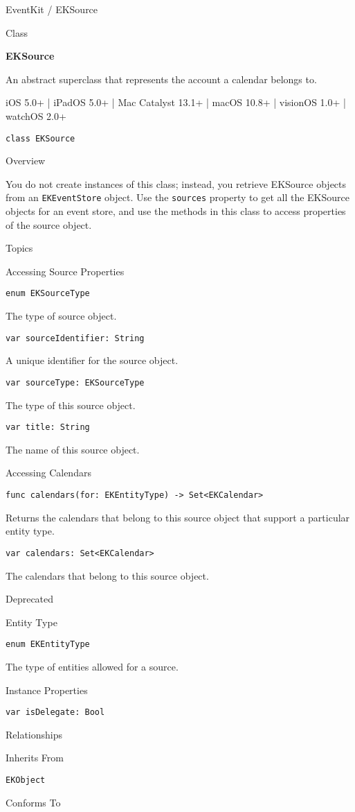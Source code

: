 \documentclass{article}
\title{}
\author{}
\date{}
\begin{document}
EventKit / EKSource

Class

\textbf{EKSource}

An abstract superclass that represents the account a calendar belongs to.

iOS 5.0+ | iPadOS 5.0+ | Mac Catalyst 13.1+ | macOS 10.8+ | visionOS 1.0+ | watchOS 2.0+

\texttt{class EKSource}

Overview

You do not create instances of this class; instead, you retrieve EKSource objects from an \texttt{EKEventStore}
object. Use the \texttt{sources} property to get all the EKSource objects for an event store, and use the methods in this
class to access properties of the source object.

Topics

Accessing Source Properties

\texttt{enum EKSourceType}

The type of source object.

\texttt{var sourceIdentifier: String}

A unique identifier for the source object.

\texttt{var sourceType: EKSourceType}

The type of this source object.

\texttt{var title: String}

The name of this source object.

Accessing Calendars

\texttt{func calendars(for: EKEntityType) -> Set<EKCalendar>}

Returns the calendars that belong to this source object that support a particular entity type.

\texttt{var calendars: Set<EKCalendar>}

The calendars that belong to this source object.

Deprecated

Entity Type

\texttt{enum EKEntityType}

The type of entities allowed for a source.

Instance Properties

\texttt{var isDelegate: Bool}

Relationships

Inherits From

\texttt{EKObject}

Conforms To
\end{document}
